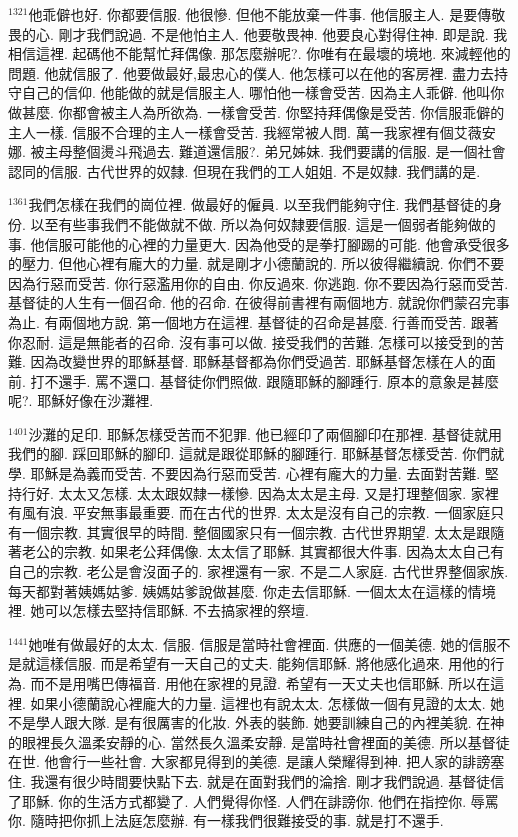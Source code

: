 \documentclass{book}
\begin{document}
$^{1321}$他乖僻也好.
你都要信服.
他很慘.
但他不能放棄一件事.
他信服主人.
是要傳敬畏的心.
剛才我們說過.
不是他怕主人.
他要敬畏神.
他要良心對得住神.
即是說.
我相信這裡.
起碼他不能幫忙拜偶像.
那怎麼辦呢?.
你唯有在最壞的境地.
來減輕他的問題.
他就信服了.
他要做最好,最忠心的僕人.
他怎樣可以在他的客房裡.
盡力去持守自己的信仰.
他能做的就是信服主人.
哪怕他一樣會受苦.
因為主人乖僻.
他叫你做甚麼.
你都會被主人為所欲為.
一樣會受苦.
你堅持拜偶像是受苦.
你信服乖僻的主人一樣.
信服不合理的主人一樣會受苦.
我經常被人問.
萬一我家裡有個艾薇安娜.
被主母整個燙斗飛過去.
難道還信服?.
弟兄姊妹.
我們要講的信服.
是一個社會認同的信服.
古代世界的奴隸.
但現在我們的工人姐姐.
不是奴隸.
我們講的是.

$^{1361}$我們怎樣在我們的崗位裡.
做最好的僱員.
以至我們能夠守住.
我們基督徒的身份.
以至有些事我們不能做就不做.
所以為何奴隸要信服.
這是一個弱者能夠做的事.
他信服可能他的心裡的力量更大.
因為他受的是拳打腳踢的可能.
他會承受很多的壓力.
但他心裡有龐大的力量.
就是剛才小德蘭說的.
所以彼得繼續說.
你們不要因為行惡而受苦.
你行惡濫用你的自由.
你反過來.
你逃跑.
你不要因為行惡而受苦.
基督徒的人生有一個召命.
他的召命.
在彼得前書裡有兩個地方.
就說你們蒙召完事為止.
有兩個地方說.
第一個地方在這裡.
基督徒的召命是甚麼.
行善而受苦.
跟著你忍耐.
這是無能者的召命.
沒有事可以做.
接受我們的苦難.
怎樣可以接受到的苦難.
因為改變世界的耶穌基督.
耶穌基督都為你們受過苦.
耶穌基督怎樣在人的面前.
打不還手.
罵不還口.
基督徒你們照做.
跟隨耶穌的腳踵行.
原本的意象是甚麼呢?.
耶穌好像在沙灘裡.

$^{1401}$沙灘的足印.
耶穌怎樣受苦而不犯罪.
他已經印了兩個腳印在那裡.
基督徒就用我們的腳.
踩回耶穌的腳印.
這就是跟從耶穌的腳踵行.
耶穌基督怎樣受苦.
你們就學.
耶穌是為義而受苦.
不要因為行惡而受苦.
心裡有龐大的力量.
去面對苦難.
堅持行好.
太太又怎樣.
太太跟奴隸一樣慘.
因為太太是主母.
又是打理整個家.
家裡有風有浪.
平安無事最重要.
而在古代的世界.
太太是沒有自己的宗教.
一個家庭只有一個宗教.
其實很早的時間.
整個國家只有一個宗教.
古代世界期望.
太太是跟隨著老公的宗教.
如果老公拜偶像.
太太信了耶穌.
其實都很大件事.
因為太太自己有自己的宗教.
老公是會沒面子的.
家裡還有一家.
不是二人家庭.
古代世界整個家族.
每天都對著姨媽姑爹.
姨媽姑爹說做甚麼.
你走去信耶穌.
一個太太在這樣的情境裡.
她可以怎樣去堅持信耶穌.
不去搞家裡的祭壇.

$^{1441}$她唯有做最好的太太.
信服.
信服是當時社會裡面.
供應的一個美德.
她的信服不是就這樣信服.
而是希望有一天自己的丈夫.
能夠信耶穌.
將他感化過來.
用他的行為.
而不是用嘴巴傳福音.
用他在家裡的見證.
希望有一天丈夫也信耶穌.
所以在這裡.
如果小德蘭說心裡龐大的力量.
這裡也有說太太.
怎樣做一個有見證的太太.
她不是學人跟大隊.
是有很厲害的化妝.
外表的裝飾.
她要訓練自己的內裡美貌.
在神的眼裡長久溫柔安靜的心.
當然長久溫柔安靜.
是當時社會裡面的美德.
所以基督徒在世.
他會行一些社會.
大家都見得到的美德.
是讓人榮耀得到神.
把人家的誹謗塞住.
我還有很少時間要快點下去.
就是在面對我們的淪捨.
剛才我們說過.
基督徒信了耶穌.
你的生活方式都變了.
人們覺得你怪.
人們在誹謗你.
他們在指控你.
辱罵你.
隨時把你抓上法庭怎麼辦.
有一樣我們很難接受的事.
就是打不還手.
\end{document}
